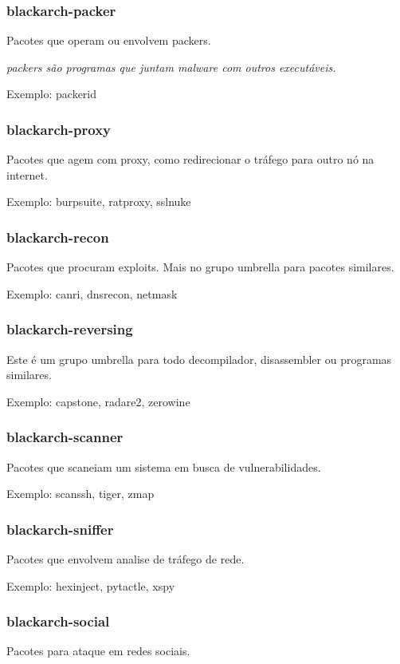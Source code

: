 \documentclass[a4paper, oneside, 11pt]{book}
\begin{document}
\subsubsection{blackarch-packer}
Pacotes que operam ou envolvem packers.

\textit{packers são programas que juntam malware com outros executáveis.}

Exemplo: packerid

\subsubsection{blackarch-proxy}
Pacotes que agem com proxy, como redirecionar o tráfego para outro nó na internet.

Exemplo: burpsuite, ratproxy, sslnuke

\subsubsection{blackarch-recon}
Pacotes que procuram exploits. Mais no grupo umbrella para pacotes similares.

Exemplo: canri, dnsrecon, netmask

\subsubsection{blackarch-reversing}
Este é um grupo umbrella para todo decompilador, disassembler ou programas similares.

Exemplo: capstone, radare2, zerowine

\subsubsection{blackarch-scanner}
Pacotes que scaneiam um sistema em busca de vulnerabilidades.

Exemplo: scanssh, tiger, zmap

\subsubsection{blackarch-sniffer}
Pacotes que envolvem analise de tráfego de rede.

Exemplo: hexinject, pytactle, xspy

\subsubsection{blackarch-social}
Pacotes para ataque em redes sociais.
\end{document}
